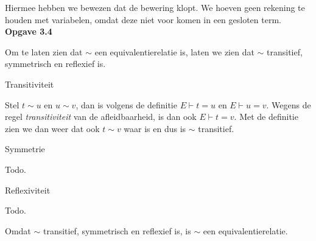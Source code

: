\documentclass[a4paper,11pt]{article}
\begin{document}
Hiermee hebben we bewezen dat de bewering klopt. We hoeven geen rekening te
houden met variabelen, omdat deze niet voor komen in een gesloten term.\\[2em]


{\bf Opgave 3.4} %

Om te laten zien dat $\sim$ een equivalentierelatie is, laten we zien dat $\sim$
transitief, symmetrisch en reflexief is.

\begin{description}

\item{Transitiviteit}

  Stel $t \sim u$ en $u \sim v$, dan is volgens de definitie $E \vdash t = u$ en
  $E \vdash u = v$. Wegens de regel \emph{transitiviteit} van de
  afleidbaarheid, is dan ook $E \vdash t = v$. Met de definitie zien we dan
  weer dat ook $t \sim v$ waar is en dus is $\sim$ transitief.

\item{Symmetrie}

  Todo.

\item{Reflexiviteit}

  Todo.

\end{description}

Omdat $\sim$ transitief, symmetrisch en reflexief is, is $\sim$ een
equivalentierelatie.
\end{document}
